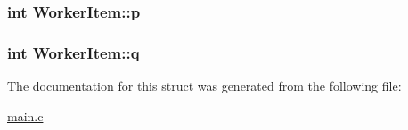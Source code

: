 \subsubsection[{\texorpdfstring{p}{p}}]{\setlength{\rightskip}{0pt plus 5cm}int Worker\+Item\+::p}\hypertarget{structWorkerItem_a56f8195e12033bf669e3543ac37035bf}{}\label{structWorkerItem_a56f8195e12033bf669e3543ac37035bf}
\subsubsection[{\texorpdfstring{q}{q}}]{\setlength{\rightskip}{0pt plus 5cm}int Worker\+Item\+::q}\hypertarget{structWorkerItem_aca226a9caa91a2d8d8705681767607b2}{}\label{structWorkerItem_aca226a9caa91a2d8d8705681767607b2}


The documentation for this struct was generated from the following file\+:\begin{DoxyCompactItemize}
\item 
\hyperlink{main_8c}{main.\+c}\end{DoxyCompactItemize}
